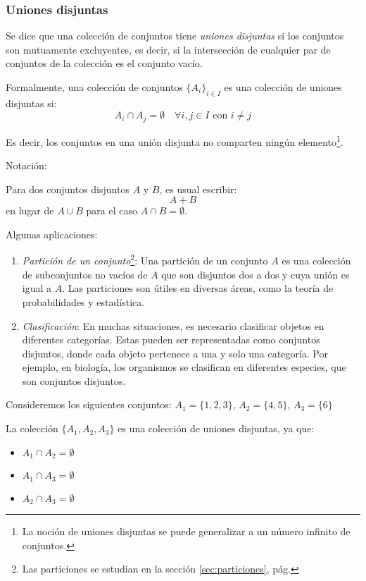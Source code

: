 \subsubsection{Uniones disjuntas}
\vspace{1em}

\begin{fmd-definition}
	Se dice que una colección de conjuntos tiene \textit{uniones disjuntas} si los conjuntos son mutuamente excluyentes, es decir, si la intersección de cualquier par de conjuntos de la colección es el conjunto vacío.
	
	Formalmente, una colección de conjuntos \(\{A_i\}_{i \in I}\) es una colección de uniones disjuntas si:
	\[A_i \cap A_j = \emptyset \quad \forall i, j \in I \mbox{ con } i \neq j\]
	
	Es decir, los conjuntos en una unión disjunta no comparten ningún elemento\footnote{La noción de uniones disjuntas se puede generalizar a un número infinito de conjuntos.}.
	
	Notación:
	
	Para dos conjuntos disjuntos $A$ y $B$, es usual escribir:
	\[ A + B \]
	en lugar de $A \cup B$ para el caso $A \cap B = \emptyset$.
\end{fmd-definition}

Algunas aplicaciones:

\begin{enumerate}
	\item \textit{Partición de un conjunto}\footnote{Las particiones se estudian en la sección \ref{sec:particiones}, pág. \pageref{sec:particiones}}: Una partición de un conjunto \(A\) es una colección de subconjuntos no vacíos de \(A\) que son disjuntos dos a dos y cuya unión es igual a \(A\).  Las particiones son útiles en diversas áreas, como la teoría de probabilidades y estadística.
	
	\item \textit{Clasificación}: En muchas situaciones, es necesario clasificar objetos en diferentes categorías. Estas pueden ser representadas como conjuntos disjuntos, donde cada objeto pertenece a una y solo una categoría. Por ejemplo, en biología, los organismos se clasifican en diferentes especies, que son conjuntos disjuntos.
\end{enumerate}

\begin{fmd-example}
	Consideremos los siguientes conjuntos: \(A_1 = \{1, 2, 3\}\), \(A_2 = \{4, 5\}\), \(A_3 = \{6\}\)
	
	La colección \(\{A_1, A_2, A_3\}\) es una colección de uniones disjuntas, ya que:
	\begin{itemize}[itemsep=0pt]
		\item \(A_1 \cap A_2 = \emptyset\)
		\item \(A_1 \cap A_3 = \emptyset\)
		\item \(A_2 \cap A_3 = \emptyset\)
	\end{itemize}
\end{fmd-example}


